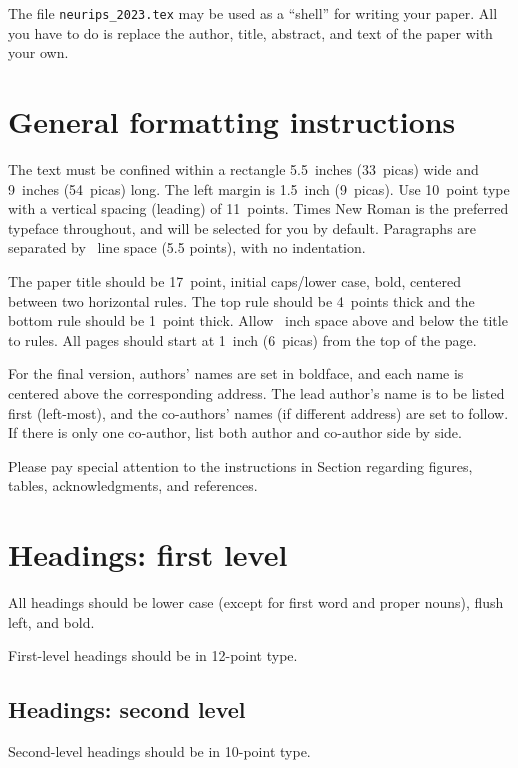 \documentclass{article}
\begin{document}
The file \verb+neurips_2023.tex+ may be used as a ``shell'' for writing your
paper. All you have to do is replace the author, title, abstract, and text of
the paper with your own.



\section{General formatting instructions}
\label{gen_inst}


The text must be confined within a rectangle 5.5~inches (33~picas) wide and
9~inches (54~picas) long. The left margin is 1.5~inch (9~picas).  Use 10~point
type with a vertical spacing (leading) of 11~points.  Times New Roman is the
preferred typeface throughout, and will be selected for you by default.
Paragraphs are separated by ~line space (5.5 points), with no
indentation.


The paper title should be 17~point, initial caps/lower case, bold, centered
between two horizontal rules. The top rule should be 4~points thick and the
bottom rule should be 1~point thick. Allow ~inch space above and
below the title to rules. All pages should start at 1~inch (6~picas) from the
top of the page.


For the final version, authors' names are set in boldface, and each name is
centered above the corresponding address. The lead author's name is to be listed
first (left-most), and the co-authors' names (if different address) are set to
follow. If there is only one co-author, list both author and co-author side by
side.


Please pay special attention to the instructions in Section 
regarding figures, tables, acknowledgments, and references.


\section{Headings: first level}
\label{headings}


All headings should be lower case (except for first word and proper nouns),
flush left, and bold.


First-level headings should be in 12-point type.


\subsection{Headings: second level}


Second-level headings should be in 10-point type.
\end{document}
